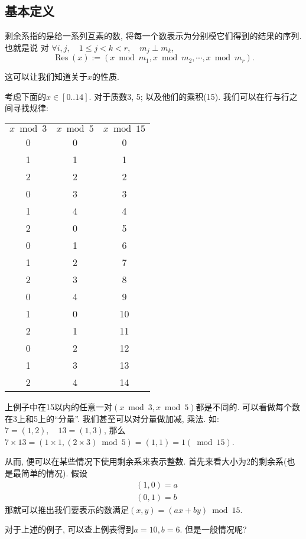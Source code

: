\documentclass{ctexart}
\begin{document}
\subsection{基本定义} 剩余系指的是给一系列互素的数, 将每一个数表示为分别模它们得到的结果的序列. 也就是说
对 $\forall i, j, \quad 1 \leqslant j<k<r, \quad m_j \perp m_k$, $$\operatorname{Res}(x):=\left(x \bmod m_1, x \bmod m_2, \cdots, x \bmod m_r\right).$$

这可以让我们知道关于$x$的性质.  

\begin{example}
    考虑下面的$x\in [0..14]$.  对于质数3, 5; 以及他们的乘积(15). 我们可以在行与行之间寻找规律:
    \begin{center}
    \begin{tabular}{ccc}
        $x \bmod 3$ & $x \bmod 5$& $x \bmod 15$ \\
0 & 0 & 0 \\
1 & 1 & 1 \\
2 & 2 & 2 \\
0 & 3 & 3 \\
1 & 4 & 4 \\
2 & 0 & 5 \\
0 & 1 & 6 \\
1 & 2 & 7 \\
2 & 3 & 8 \\
0 & 4 & 9 \\
1 & 0 & 10 \\
2 & 1 & 11 \\
0 & 2 & 12\\
1 & 3 & 13\\
2 & 4 & 14
\end{tabular}
\end{center}
\end{example}

上例子中在15以内的任意一对$(x \bmod 3, x \bmod 5)$都是不同的. 可以看做每个数在3上和5上的``分量''. 我们甚至可以对分量做加减, 乘法. 如: $7=(1,2), \quad 13=(1,3)$, 那么$7 \times  13 = (1 \times  1, (2 \times 3) \bmod 5) = (1,1)=1 (\bmod 15)$. 


从而, 便可以在某些情况下使用剩余系来表示整数. 首先来看大小为2的剩余系(也是最简单的情况). 假设
$$\begin{aligned} & (1,0)=a \\ & (0,1)=b\end{aligned}$$
那就可以推出我们要表示的数满足$(x, y)=(a x+b y) \bmod 15$. 

对于上述的例子, 可以查上例表得到$a=10, b=6$. 但是一般情况呢?
\end{document}
